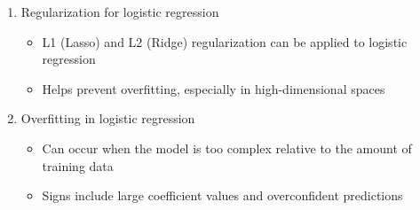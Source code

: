 \documentclass{article}
\begin{document}
\begin{enumerate}
    \item Regularization for logistic regression
    \begin{itemize}
        \item L1 (Lasso) and L2 (Ridge) regularization can be applied to logistic regression
        \item Helps prevent overfitting, especially in high-dimensional spaces
    \end{itemize}
    
    \item Overfitting in logistic regression
    \begin{itemize}
        \item Can occur when the model is too complex relative to the amount of training data
        \item Signs include large coefficient values and overconfident predictions
    \end{itemize}
\end{enumerate}
\end{document}
